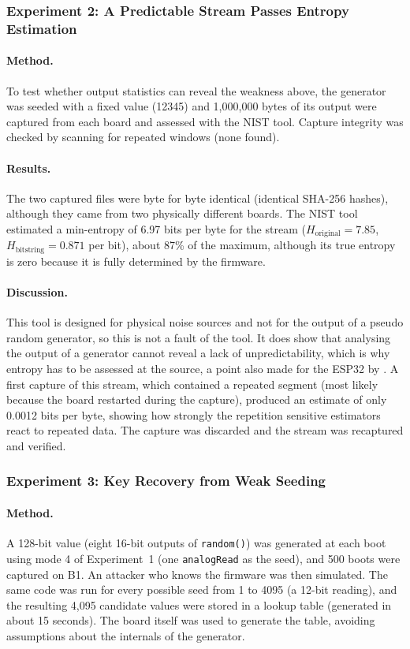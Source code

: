 \documentclass[a4paper, 12pt]{article}
\begin{document}
\subsubsection{Experiment 2: A Predictable Stream Passes Entropy Estimation}
 
\paragraph{Method.} To test whether output statistics can reveal the weakness above, the generator was seeded with a fixed value (12345) and 1,000,000 bytes of its output were captured from each board and assessed with the NIST tool. Capture integrity was checked by scanning for repeated windows (none found).
 
\paragraph{Results.} The two captured files were byte for byte identical (identical SHA-256 hashes), although they came from two physically different boards. The NIST tool estimated a min-entropy of 6.97 bits per byte for the stream ($H_{\mathrm{original}}=7.85$, $H_{\mathrm{bitstring}}=0.871$ per bit), about 87\% of the maximum, although its true entropy is zero because it is fully determined by the firmware.
 
\paragraph{Discussion.} This tool is designed for physical noise sources and not for the output of a pseudo random generator, so this is not a fault of the tool. It does show that analysing the output of a generator cannot reveal a lack of unpredictability, which is why entropy has to be assessed at the source, a point also made for the ESP32 by \citep{blancoromero2026bootstrap}. A first capture of this stream, which contained a repeated segment (most likely because the board restarted during the capture), produced an estimate of only 0.0012 bits per byte, showing how strongly the repetition sensitive estimators react to repeated data. The capture was discarded and the stream was recaptured and verified.
 
\subsubsection{Experiment 3: Key Recovery from Weak Seeding}
 
\paragraph{Method.} A 128-bit value (eight 16-bit outputs of \texttt{random()}) was generated at each boot using mode 4 of Experiment~1 (one \texttt{analogRead} as the seed), and 500 boots were captured on B1. An attacker who knows the firmware was then simulated. The same code was run for every possible seed from 1 to 4095 (a 12-bit reading), and the resulting 4,095 candidate values were stored in a lookup table (generated in about 15 seconds). The board itself was used to generate the table, avoiding assumptions about the internals of the generator.
 
\end{document}
